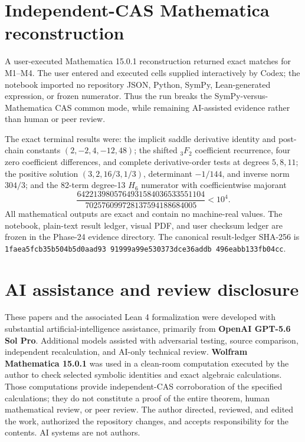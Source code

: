 \documentclass[11pt]{article}
\theoremstyle{definition}
\theoremstyle{remark}
\begin{document}
\section{Independent-CAS Mathematica reconstruction}\label{sec:mathematica}

A user-executed Mathematica 15.0.1 reconstruction returned exact matches for
M1--M4.  The user entered and executed cells supplied interactively by Codex;
the notebook imported no repository JSON, Python, SymPy, Lean-generated
expression, or frozen numerator.  Thus the run breaks the
SymPy-versus-Mathematica CAS common mode, while remaining AI-assisted evidence
rather than human or peer review.

The exact terminal results were: the implicit saddle derivative identity and
post-chain constants $(2,-2,4,-12,48)$; the shifted ${}_3F_2$ coefficient
recurrence, four zero coefficient differences, and complete derivative-order
tests at degrees $5,8,11$; the positive solution
$(3,2,16/3,1/3)$, determinant $-1/144$, and inverse norm $304/3$; and the
82-term degree-13 $H_6$ numerator with coefficientwise majorant
\[
 \frac{6422139805764931584036533551104}
 {702576099728137594188684005}<10^4.
\]
All mathematical outputs are exact and contain no machine-real values.  The
notebook, plain-text result ledger, visual PDF, and user checksum ledger are
frozen in the Phase-24 evidence directory.  The canonical result-ledger
SHA-256 is
\texttt{1faea5fc\allowbreak b35b504b\allowbreak 5d0aad93\allowbreak
91999a99\allowbreak e530373d\allowbreak ce36addb\allowbreak
496eabb1\allowbreak 33fb04cc}.

\section{AI assistance and review disclosure}

These papers and the associated Lean 4 formalization were developed with
substantial artificial-intelligence assistance, primarily from
\textbf{OpenAI GPT-5.6 Sol Pro}.  Additional models assisted with adversarial
testing, source comparison, independent recalculation, and AI-only technical
review.  \textbf{Wolfram Mathematica 15.0.1} was used in a clean-room
computation executed by the author to check selected symbolic identities and
exact algebraic calculations.  Those computations provide independent-CAS
corroboration of the specified calculations; they do not constitute a proof
of the entire theorem, human mathematical review, or peer review.  The author
directed, reviewed, and edited the work, authorized the repository changes,
and accepts responsibility for the contents.  AI systems are not authors.
\end{document}
